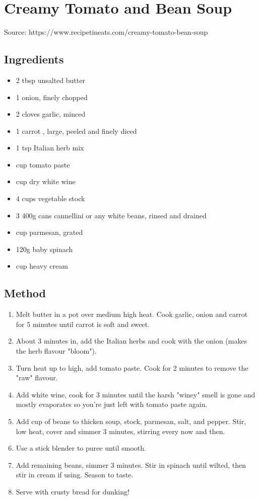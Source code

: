 \section{Creamy Tomato and Bean Soup}


Source: https://www.recipetineats.com/creamy-tomato-bean-soup

\subsection{Ingredients}

\begin{itemize}
    \item 2 tbsp unsalted butter
    \item 1 onion, finely chopped
    \item 2 cloves garlic, minced
    \item 1 carrot , large, peeled and finely diced
    \item 1 tsp Italian herb mix
    \item {} cup tomato paste
    \item {} cup dry white wine
    \item 4 cups vegetable stock
    \item 3 400g cans cannellini or any white beans, rinsed and drained
    \item {} cup parmesan, grated
    \item 120g baby spinach
    \item {} cup heavy cream
\end{itemize}

\subsection{Method}

\begin{enumerate}
    \item Melt butter in a pot over medium high heat. Cook garlic, onion and carrot for 5 minutes until carrot is soft and sweet.
    \item About 3 minutes in, add the Italian herbs and cook with the onion (makes the herb flavour "bloom").
    \item Turn heat up to high, add tomato paste. Cook for 2 minutes to remove the "raw" flavour.
    \item Add white wine, cook for 3 minutes until the harsh "winey" smell is gone and mostly evaporates so you're just left with tomato paste again.
    \item Add  cup of beans to thicken soup, stock, parmesan, salt, and pepper. Stir, low heat, cover and simmer 3 minutes, stirring every now and then.
    \item Use a stick blender to puree until smooth.
    \item Add remaining beans, simmer 3 minutes. Stir in spinach until wilted, then stir in cream if using. Season to taste.
    \item Serve with crusty bread for dunking!
\end{enumerate}
